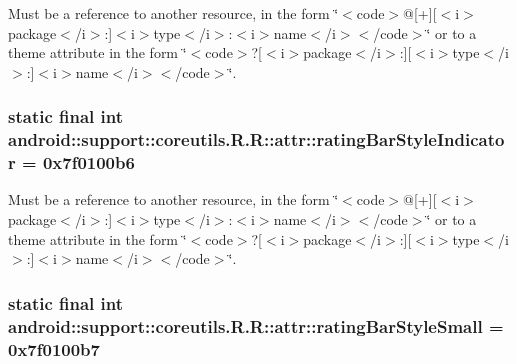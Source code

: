 Must be a reference to another resource, in the form \char`\"{}$<$code$>$@\mbox{[}+\mbox{]}\mbox{[}$<$i$>$package$<$/i$>$:\mbox{]}$<$i$>$type$<$/i$>$:$<$i$>$name$<$/i$>$$<$/code$>$\char`\"{} or to a theme attribute in the form \char`\"{}$<$code$>$?\mbox{[}$<$i$>$package$<$/i$>$:\mbox{]}\mbox{[}$<$i$>$type$<$/i$>$:\mbox{]}$<$i$>$name$<$/i$>$$<$/code$>$\char`\"{}. \hypertarget{classandroid_1_1support_1_1coreutils_1_1_r_1_1attr_0e0924ca5a58e76a0a48db31e1b92804}{
\subsubsection[{ratingBarStyleIndicator}]{\setlength{\rightskip}{0pt plus 5cm}static final int android::support::coreutils.R.R::attr::ratingBarStyleIndicator = 0x7f0100b6}}
\label{classandroid_1_1support_1_1coreutils_1_1_r_1_1attr_0e0924ca5a58e76a0a48db31e1b92804}


Must be a reference to another resource, in the form \char`\"{}$<$code$>$@\mbox{[}+\mbox{]}\mbox{[}$<$i$>$package$<$/i$>$:\mbox{]}$<$i$>$type$<$/i$>$:$<$i$>$name$<$/i$>$$<$/code$>$\char`\"{} or to a theme attribute in the form \char`\"{}$<$code$>$?\mbox{[}$<$i$>$package$<$/i$>$:\mbox{]}\mbox{[}$<$i$>$type$<$/i$>$:\mbox{]}$<$i$>$name$<$/i$>$$<$/code$>$\char`\"{}. \hypertarget{classandroid_1_1support_1_1coreutils_1_1_r_1_1attr_b90348f86a474766bcc5a4ce7cb3684d}{
\subsubsection[{ratingBarStyleSmall}]{\setlength{\rightskip}{0pt plus 5cm}static final int android::support::coreutils.R.R::attr::ratingBarStyleSmall = 0x7f0100b7}}
\label{classandroid_1_1support_1_1coreutils_1_1_r_1_1attr_b90348f86a474766bcc5a4ce7cb3684d}


